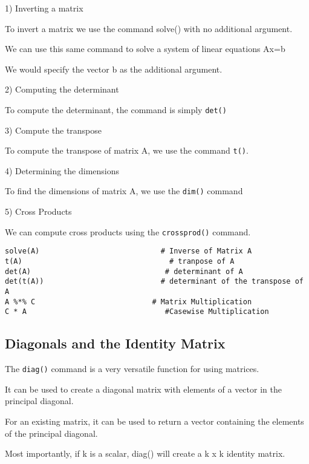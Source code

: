 1) Inverting a matrix 


To invert a matrix we use the command solve() with no additional argument.


We can use this same command to solve a system of linear equations Ax=b

We would specify the vector b as the additional argument.



2) Computing the determinant


To compute the determinant, the command is simply \texttt{det()}



3) Compute the transpose 


To compute the transpose of matrix A, we use the command \texttt{t()}.


4) Determining the dimensions 


To find the dimensions of matrix A, we use the \texttt{dim()} command


5) Cross Products


We can compute cross products using the \texttt{crossprod()} command. 

\begin{framed}
\begin{verbatim}
solve(A)                            # Inverse of Matrix A    
t(A)                                  # tranpose of A
det(A)                               # determinant of A  
det(t(A))                           # determinant of the transpose of A
A %*% C                           # Matrix Multiplication
C * A                                #Casewise Multiplication
\end{verbatim}
\end{framed}
\subsection{Diagonals and the Identity Matrix}

The \texttt{diag()} command is a very versatile function for using matrices.

It can be used to create a diagonal matrix with elements of a vector in the principal diagonal. 

For an existing matrix, it can be used to return a vector containing the elements of the principal diagonal. 

Most importantly, if k is a scalar, diag() will create a k x k identity matrix.

